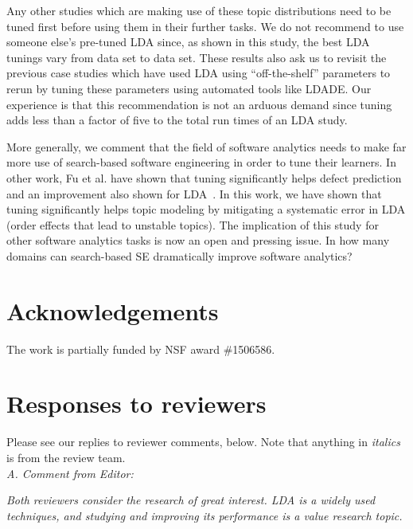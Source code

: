 \documentclass[twocolumn,5p,sort&compress]{elsarticle}
\theoremstyle{break}
\begin{document}
Any other studies which are making use of these topic distributions need to be tuned first before using them in their further tasks. We do not recommend to use someone else's pre-tuned LDA since, as shown in this study,  the best LDA tunings vary from data set to data set. These results also ask us to revisit the previous case studies which have used LDA using ``off-the-shelf'' parameters to rerun by tuning these parameters using automated tools like LDADE. Our experience is that this recommendation is not an arduous demand since tuning adds less than a factor of five to the total run times of an LDA study.

More generally, we comment that the field of software analytics needs to make far more use of search-based software engineering in order
to tune their learners. In other work, Fu et al. have shown that tuning significantly helps defect prediction~\cite{fu2016tuning} and an improvement also shown for LDA~\cite{panichella2013effectively}. In this work, we have shown that tuning significantly helps topic modeling by mitigating a systematic error in LDA  (order effects that lead to unstable topics). The implication of this study for other software analytics tasks is now an open
and pressing issue. 
In how many domains can search-based SE dramatically improve software analytics?


\section*{Acknowledgements}
		The work is partially funded by NSF award \#1506586.
	
\balance

\medskip




\clearpage
{}
\setcounter{page}{1}

\nobalance

\pagestyle{plain} 
\section*{Responses to reviewers}

Please see our replies to reviewer comments, below. Note that anything in {\em italics} is from the review team.\\

\noindent
\textit{A. Comment from Editor:}

{\em Both reviewers consider the research of great interest. LDA is a widely used techniques, and studying and improving its performance is a value research topic.}
\end{document}
